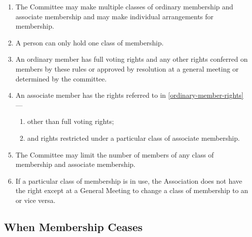 \documentclass[../constitution.tex]{subfiles}
\begin{document}
\begin{enumerate}
\item The Committee may make multiple classes of ordinary membership and associate membership and may make individual arrangements for membership. 
\item A person  can only hold one class of membership. 
\item An ordinary member has full voting rights and any other rights conferred on members by these rules or approved by resolution at a general meeting or determined by the committee. \label{ordinary-member-rights}
\item An associate member has the rights referred to in  \ref{ordinary-member-rights} --- \label{associate-member-rights}
  \begin{enumerate}
  \item other than full voting rights;
  \item and rights restricted under a particular class of associate membership.
  \end{enumerate}
\item The Committee may limit the number of members of any class of membership and associate membership.
\item \label{swap-ordinary-associate-membership} If a particular class of membership is in use, the Association does not have the right except at a General Meeting to change a class of  membership to an  or vice versa.
\end{enumerate}


\subsection{When Membership Ceases} \label{when-membership-ceases}
\end{document}
